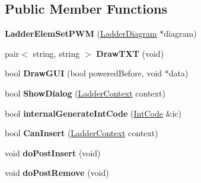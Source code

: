 \subsection*{Public Member Functions}
\begin{DoxyCompactItemize}
\item 
\hypertarget{class_ladder_elem_set_p_w_m_a24dfc2064f6165210d4844b382ebe51a}{{\bfseries Ladder\-Elem\-Set\-P\-W\-M} (\hyperlink{class_ladder_diagram}{Ladder\-Diagram} $\ast$diagram)}\label{class_ladder_elem_set_p_w_m_a24dfc2064f6165210d4844b382ebe51a}

\item 
\hypertarget{class_ladder_elem_set_p_w_m_af6c4eb679608df546936b44cebc16a8b}{pair$<$ string, string $>$ {\bfseries Draw\-T\-X\-T} (void)}\label{class_ladder_elem_set_p_w_m_af6c4eb679608df546936b44cebc16a8b}

\item 
\hypertarget{class_ladder_elem_set_p_w_m_aaaf95c1e471cd91e63dfb0e94d5f89d2}{bool {\bfseries Draw\-G\-U\-I} (bool powered\-Before, void $\ast$data)}\label{class_ladder_elem_set_p_w_m_aaaf95c1e471cd91e63dfb0e94d5f89d2}

\item 
\hypertarget{class_ladder_elem_set_p_w_m_a069fc8ba1eec27d5fabb6b75b181aa2e}{bool {\bfseries Show\-Dialog} (\hyperlink{struct_ladder_context}{Ladder\-Context} context)}\label{class_ladder_elem_set_p_w_m_a069fc8ba1eec27d5fabb6b75b181aa2e}

\item 
\hypertarget{class_ladder_elem_set_p_w_m_a981d9f5a070bf989c897d7cd8c9be171}{bool {\bfseries internal\-Generate\-Int\-Code} (\hyperlink{class_int_code}{Int\-Code} \&ic)}\label{class_ladder_elem_set_p_w_m_a981d9f5a070bf989c897d7cd8c9be171}

\item 
\hypertarget{class_ladder_elem_set_p_w_m_a1b753dca949fc99e004c236d937e4973}{bool {\bfseries Can\-Insert} (\hyperlink{struct_ladder_context}{Ladder\-Context} context)}\label{class_ladder_elem_set_p_w_m_a1b753dca949fc99e004c236d937e4973}

\item 
\hypertarget{class_ladder_elem_set_p_w_m_ac0f34dd302aebb93c0a631758d3642aa}{void {\bfseries do\-Post\-Insert} (void)}\label{class_ladder_elem_set_p_w_m_ac0f34dd302aebb93c0a631758d3642aa}

\item 
\hypertarget{class_ladder_elem_set_p_w_m_aa06b6da31442eef38fdd794e0172023b}{void {\bfseries do\-Post\-Remove} (void)}\label{class_ladder_elem_set_p_w_m_aa06b6da31442eef38fdd794e0172023b}


\end{DoxyCompactItemize}
